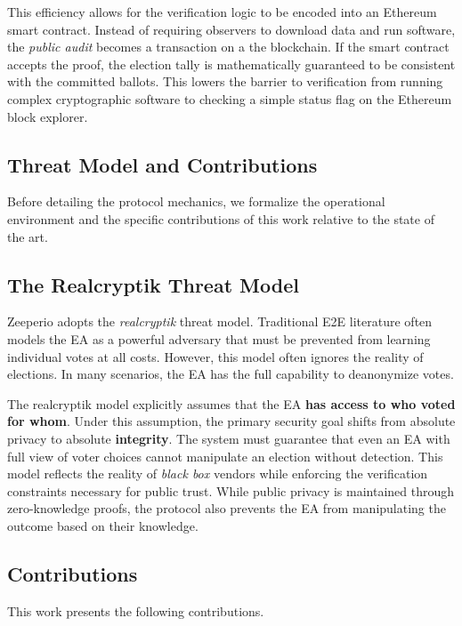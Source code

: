 This efficiency allows for the verification logic to be encoded into an
Ethereum smart contract. Instead of requiring observers to download data and
run software, the \emph{public audit} becomes a transaction on a the blockchain. 
If the smart contract accepts the proof, the election tally is mathematically guaranteed to be consistent with the committed ballots. 
This lowers the barrier to verification from running complex cryptographic software to checking a simple status flag on the Ethereum block explorer.

\subsection{Threat Model and Contributions}

Before detailing the protocol mechanics, we formalize the operational environment and the specific contributions of this work relative to the state of the art.

\subsection{The Realcryptik Threat Model}
Zeeperio adopts the \textit{realcryptik} threat model. 
Traditional E2E literature often models the EA as a powerful adversary that must be prevented from learning individual votes at all costs. 
However, this model often ignores the reality of elections. In many scenarios, the EA has the full capability to deanonymize votes.

The realcryptik model explicitly assumes that the EA \textbf{has access to who voted for whom}. Under this assumption, the primary security goal shifts from absolute privacy to absolute \textbf{integrity}. 
The system must guarantee that even an EA with full view of voter choices cannot manipulate an election without detection. This model reflects the reality of \emph{black box} vendors while enforcing the verification constraints necessary for public trust. 
While public privacy is maintained through zero-knowledge proofs, the protocol also prevents the EA from manipulating the outcome based on their knowledge.

\subsection{Contributions}
This work presents the following contributions.

